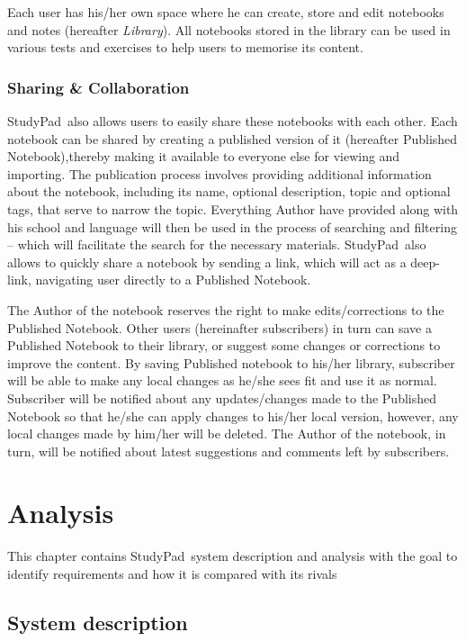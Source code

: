 \documentclass[thesis=B,english]{FITthesis}[2012/10/20]
\newcommand{\appname}{StudyPad}
\begin{document}
Each user has his/her own space where he can create, store and edit notebooks and notes (hereafter \textit{Library}). All notebooks stored in the library can be used in various tests and exercises to help users to memorise its content. 

\subsection{Sharing \& Collaboration }
\appname\ also allows users to easily share these notebooks with each other. Each notebook can be shared by creating a published version of it (hereafter Published Notebook),thereby making it available to everyone else for viewing and importing.
The publication process involves providing additional information about the notebook, including its name, optional description, topic and optional tags, that serve to narrow the topic. Everything Author have provided along with his school and language will then be used in the process of searching and filtering -- which will facilitate the search for the necessary materials. \appname\ also allows to quickly share a notebook by sending a link, which will act as a deep-link, navigating user directly to a Published Notebook.

The Author of the notebook reserves the right to make edits/corrections to the Published Notebook. Other users (hereinafter subscribers) in turn can save a Published Notebook to their library, or suggest some changes or corrections to improve the content. By saving Published notebook to his/her library, subscriber will be able to make any local changes as he/she sees fit and use it as normal. Subscriber will be notified about any updates/changes made to the Published Notebook so that he/she can apply changes to his/her local version, however, any local changes made by him/her will be deleted. The Author of the notebook, in turn, will be notified about latest suggestions and comments left by  subscribers.

\chapter{Analysis}
This chapter contains \appname\ system description and analysis with the goal to identify requirements and how it is compared with its rivals


\section{System description}
\end{document}
